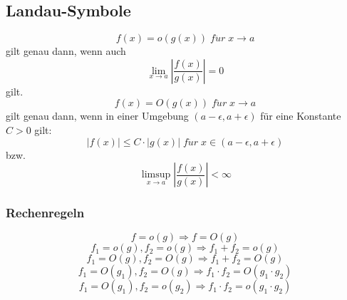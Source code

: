 \documentclass[a4paper,twocolumn,10pt]{article}
\begin{document}
\subsection{Landau-Symbole}
\begin{equation*}
f(x)=o(g(x))\;f\ddot{u}r\;x\rightarrow a
\end{equation*}
gilt genau dann, wenn auch
\begin{equation*}
\lim\limits_{x\rightarrow a}\left|\frac{f(x)}{g(x)}\right|=0
\end{equation*}
gilt.
\begin{equation*}
f(x)=O(g(x))\;f\ddot{u}r\;x\rightarrow a
\end{equation*}
gilt genau dann, wenn in einer Umgebung $(a-\epsilon, a+\epsilon)$ für eine Konstante $C>0$ gilt:
\begin{equation*}
|f(x)|\leq C\cdot |g(x)|\;f\ddot{u}r\;x\in (a-\epsilon,a+\epsilon)
\end{equation*}
bzw.
\begin{equation*}
\limsup\limits_{x\rightarrow a}\left|\frac{f(x)}{g(x)}\right|<\infty
\end{equation*}

\subsubsection{Rechenregeln}
\begin{equation*}
f=o(g)\Rightarrow f=O(g)
\end{equation*}
\begin{equation*}
f_1=o(g),f_2=o(g)\Rightarrow f_1+f_2=o(g)
\end{equation*}
\begin{equation*}
f_1=O(g),f_2=O(g)\Rightarrow f_1+f_2=O(g)
\end{equation*}
\begin{equation*}
f_1=O(g_1), f_2=O(g)\Rightarrow f_1\cdot f_2=O(g_1\cdot g_2)
\end{equation*}
\begin{equation*}
f_1=O(g_1),f_2=o(g_2)\Rightarrow f_1\cdot f_2 = o(g_1\cdot g_2)
\end{equation*}
\end{document}
